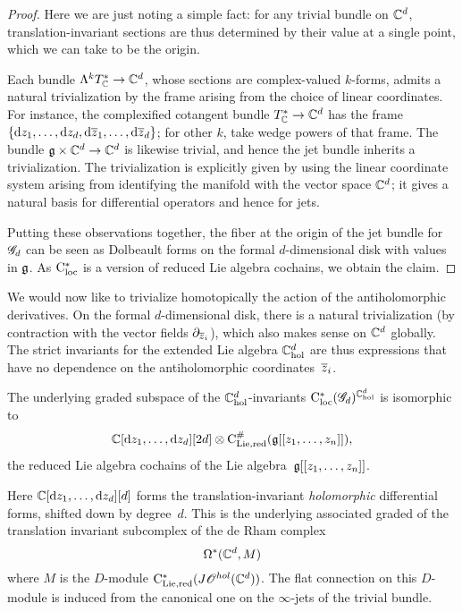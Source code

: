 \begin{proof}
Here we are just noting a simple fact: 
for any trivial bundle on $\mathbb C^d$, 
translation-invariant sections are thus determined by their value at a single point,
which we can take to be the origin.

Each bundle $\Lambda^k T_\mathbb C^* \to \mathbb C^d$, whose sections are complex-valued $k$-forms, admits a natural trivialization by the frame arising from the choice of linear coordinates. 
For instance, the complexified cotangent bundle $T^*_\mathbb C \to \mathbb C^d$ has the frame $\{{\rm d} z_1,\ldots,{\rm d} z_d, {\rm d} \overline{z}_1,\ldots,{\rm d} \overline{z}_d\}$; for other $k$, take wedge powers of that frame. 
The bundle $\mathfrak g \times \mathbb C^d \to \mathbb C^d$ is likewise trivial,
and hence the jet bundle inherits a trivialization.
The trivialization is explicitly given by using the linear coordinate system arising from identifying the manifold with the vector space $\mathbb C^d$;
it gives a natural basis for differential operators and hence for jets.

Putting these observations together, 
the fiber at the origin of the jet bundle for $\mathscr G_d$ can be seen as Dolbeault forms on the formal $d$-dimensional disk with values in $\mathfrak g$.
As ${\rm C}_{\rm loc}^*$ is a version of reduced Lie algebra cochains, we obtain the claim.
\end{proof}

We would now like to trivialize homotopically the action of the antiholomorphic derivatives.
On the formal $d$-dimensional disk, there is a natural trivialization (by contraction with the vector fields $\partial_{\overline{z}_i}$),
which also makes sense on $\mathbb C^d$ globally.
The strict invariants for the extended Lie algebra $\mathbb C^d_{\rm hol}$ are thus expressions that have no dependence on the antiholomorphic coordinates~$\overline{z}_i$.

\begin{lem}\label{lem: a8}
The underlying graded subspace of the $\mathbb C^d_{\rm hol}$-invariants ${\rm C}_{\rm loc}^*(\mathscr G_d)^{\mathbb C^d_{\rm hol}}$ is isomorphic to 
\[
\mathbb C[{\rm d} z_1,\ldots, {\rm d} z_d][2d] \otimes {\rm C}_{\rm Lie, red}^\#(\mathfrak g[[z_1,\ldots,z_n]]),
\]
the reduced Lie algebra cochains of the Lie algebra~$\mathfrak g[[z_1,\ldots,z_n]]$.
\end{lem}

Here $\mathbb C[{\rm d} z_1,\ldots, {\rm d} z_d][d]$ forms the translation-invariant {\em holomorphic} differential forms, 
shifted down by degree~$d$.
This is the underlying associated graded of the translation invariant subcomplex of the de Rham complex 
\[
\Omega^* (\mathbb C^d, M)
\]
where $M$ is the $D$-module ${\rm C}_{\rm Lie, red}^*(J \mathscr O^{hol}(\mathbb C^d))$. 
The flat connection on this $D$-module is induced from the canonical one on the $\infty$-jets of the trivial bundle. 

